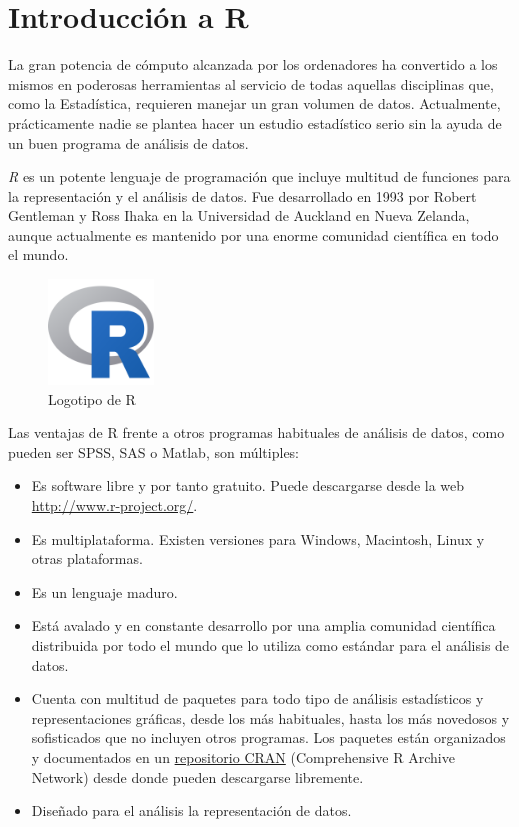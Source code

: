 \documentclass[
  a4paper,
]{scrreport}
\providecommand{\tightlist}{%
  \setlength{\itemsep}{0pt}\setlength{\parskip}{0pt}}\usepackage{longtable,booktabs,array}
\theoremstyle{definition}
\theoremstyle{definition}
\theoremstyle{remark}
\begin{document}

\hypertarget{introducciuxf3n-a-r}{%
\chapter{Introducción a R}\label{introducciuxf3n-a-r}}

La gran potencia de cómputo alcanzada por los ordenadores ha convertido
a los mismos en poderosas herramientas al servicio de todas aquellas
disciplinas que, como la Estadística, requieren manejar un gran volumen
de datos. Actualmente, prácticamente nadie se plantea hacer un estudio
estadístico serio sin la ayuda de un buen programa de análisis de datos.

\emph{R} es un potente lenguaje de programación que incluye multitud de
funciones para la representación y el análisis de datos. Fue
desarrollado en 1993 por Robert Gentleman y Ross Ihaka en la Universidad
de Auckland en Nueva Zelanda, aunque actualmente es mantenido por una
enorme comunidad científica en todo el mundo.

\begin{figure}

{\centering \includegraphics[width=0.25\textwidth,height=\textheight]{img/logos/Rlogo.png}

}

\caption{Logotipo de R}

\end{figure}

Las ventajas de R frente a otros programas habituales de análisis de
datos, como pueden ser SPSS, SAS o Matlab, son múltiples:

\begin{itemize}
\tightlist
\item
  Es software libre y por tanto gratuito. Puede descargarse desde la web
  \url{http://www.r-project.org/}.
\item
  Es multiplataforma. Existen versiones para Windows, Macintosh, Linux y
  otras plataformas.
\item
  Es un lenguaje maduro.
\item
  Está avalado y en constante desarrollo por una amplia comunidad
  científica distribuida por todo el mundo que lo utiliza como estándar
  para el análisis de datos.
\item
  Cuenta con multitud de paquetes para todo tipo de análisis
  estadísticos y representaciones gráficas, desde los más habituales,
  hasta los más novedosos y sofisticados que no incluyen otros
  programas. Los paquetes están organizados y documentados en un
  \href{https://cran.r-project.org/}{repositorio CRAN} (Comprehensive R
  Archive Network) desde donde pueden descargarse libremente.
\item
  Diseñado para el análisis la representación de datos.
\end{itemize}
\end{document}
